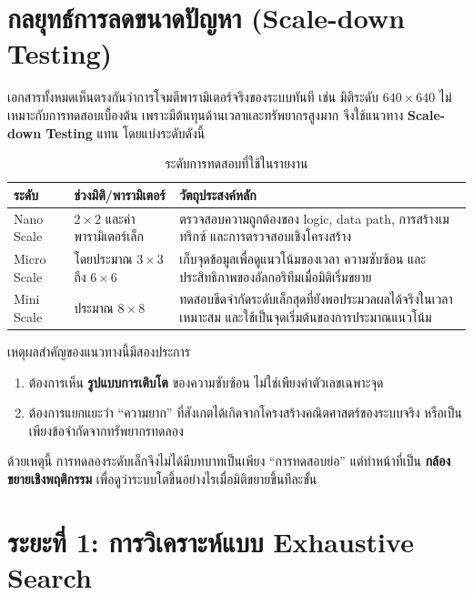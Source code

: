 \documentclass[12pt,a4paper]{article}
\newcommand{\term}[1]{\textbf{#1}}
\newcommand{\eng}[1]{\textenglish{#1}}
\begin{document}
	\section{กลยุทธ์การลดขนาดปัญหา (Scale-down Testing)}
	
	เอกสารทั้งหมดเห็นตรงกันว่าการโจมตีพารามิเตอร์จริงของระบบทันที เช่น มิติระดับ $640\times640$ ไม่เหมาะกับการทดสอบเบื้องต้น เพราะมีต้นทุนด้านเวลาและทรัพยากรสูงมาก จึงใช้แนวทาง \term{Scale-down Testing} แทน โดยแบ่งระดับดังนี้
	
	\begin{table}[H]
		\centering
		\caption{ระดับการทดสอบที่ใช้ในรายงาน}
		\begin{tabular}{p{} p{} p{}}
			\toprule
			ระดับ & ช่วงมิติ/พารามิเตอร์ & วัตถุประสงค์หลัก \\
			\midrule
			\eng{Nano Scale} & $2\times2$ และค่าพารามิเตอร์เล็ก & ตรวจสอบความถูกต้องของ \eng{logic}, \eng{data path}, การสร้างเมทริกซ์ และการตรวจสอบเชิงโครงสร้าง \\
			\eng{Micro Scale} & โดยประมาณ $3\times3$ ถึง $6\times6$ & เก็บจุดข้อมูลเพื่อดูแนวโน้มของเวลา ความซับซ้อน และประสิทธิภาพของอัลกอริทึมเมื่อมิติเริ่มขยาย \\
			\eng{Mini Scale} & ประมาณ $8\times8$ & ทดสอบขีดจำกัดระดับเล็กสุดที่ยังพอประมวลผลได้จริงในเวลาเหมาะสม และใช้เป็นจุดเริ่มต้นของการประมาณแนวโน้ม \\
			\bottomrule
		\end{tabular}
	\end{table}
	
	เหตุผลสำคัญของแนวทางนี้มีสองประการ
	\begin{enumerate}[label=\arabic*.]
		\item ต้องการเห็น \term{รูปแบบการเติบโต} ของความซับซ้อน ไม่ใช่เพียงค่าตัวเลขเฉพาะจุด
		\item ต้องการแยกแยะว่า ``ความยาก'' ที่สังเกตได้เกิดจากโครงสร้างคณิตศาสตร์ของระบบจริง หรือเป็นเพียงข้อจำกัดจากทรัพยากรทดลอง
	\end{enumerate}
	
	ด้วยเหตุนี้ การทดลองระดับเล็กจึงไม่ได้มีบทบาทเป็นเพียง ``การทดสอบย่อ'' แต่ทำหน้าที่เป็น \term{กล้องขยายเชิงพฤติกรรม} เพื่อดูว่าระบบโตขึ้นอย่างไรเมื่อมิติขยายขึ้นทีละขั้น
	
	\section{ระยะที่ 1: การวิเคราะห์แบบ Exhaustive Search}
	
\end{document}
